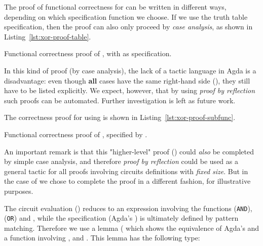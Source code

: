             The proof of functional correctness for  can be written in different ways,
            depending on which specification function we choose.
            If we use the truth table specification, then the proof can also only proceed by \emph{case analysis},
            as shown in Listing~\ref{lst:xor-proof-table}.

            \begin{listing}[h]
                \caption{Functional correctness proof of , with  as specification.
                    \label{lst:xor-proof-table}}
            \end{listing}

            In this kind of proof (by case analysis),
            the lack of a tactic language in Agda is a disadvantage:
            even though \textbf{all} cases have the same right-hand side (),
            they still have to be listed explicitly.
            We expect, however, that by using \emph{proof by reflection}~\cite{engineering-reflection-agda}
            such proofs can be automated. Further investigation is left as future work.

            The correctness proof for  using  is shown in Listing~\ref{lst:xor-proof-subfunc}.

            \begin{listing}[h]
                \caption{Functional correctness proof of , specified by .
                    \label{lst:xor-proof-subfunc}}
            \end{listing}

            An important remark is that this "higher-level" proof () could \emph{also}
            be completed by simple case analysis,
            and therefore \emph{proof by reflection} could be used as a general tactic for all proofs
            involving circuits definitions with \emph{fixed size}.
            But in the case of  we chose to complete the proof in a different fashion,
            for illustrative purposes.

            The circuit evaluation () reduces to an expression involving the functions
             (\texttt{AND}),  (\texttt{OR}) and ,
            while the specification (Agda's ) is ultimately defined by pattern matching.
            Therefore we use a lemma ( which shows the equivalence of
            Agda's  and a function involving ,  and .
            This lemma has the following type:

